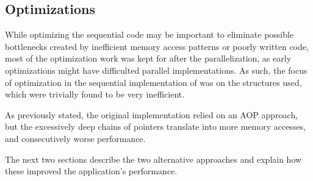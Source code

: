 \subsection{Optimizations}
\label{sec:seq:optimizations}


While optimizing the sequential code may be important to eliminate possible bottlenecks created by inefficient memory access patterns or poorly written code, most of the optimization work was kept for after the parallelization, as early optimizations might have difficulted parallel implementations.
As such, the focus of optimization in the sequential implementation of \polu was on the structures used, which were trivially found to be very inefficient.

As previously stated, the original implementation relied on an AOP approach, but the excessively deep chains of pointers translate into more memory accesses, and consecutively worse performance.

The next two sections describe the two alternative approaches and explain how these improved the application's performance.



